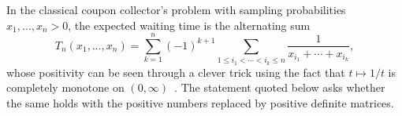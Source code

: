 

\begin{cxcredits}
\end{cxcredits}

\begin{cxcontext}
In the classical coupon collector's problem with sampling probabilities
$x_1,\ldots,x_n>0$, the expected waiting time is the alternating sum
\[
T_n(x_1,\ldots,x_n)=\sum_{k=1}^n(-1)^{k+1}
\sum_{1\le i_1<\cdots<i_k\le n}\frac{1}{x_{i_1}+\cdots+x_{i_k}},
\]
whose positivity can be seen through a clever trick using the fact that $t\mapsto1/t$ is completely monotone on $(0,\infty)$~\citep{FlajoletGardyThimonier1992}.  The statement quoted below asks whether the same holds with the positive numbers replaced by positive definite matrices. %

\end{cxcontext}


